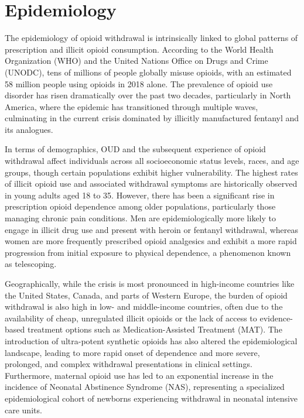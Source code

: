\section*{Epidemiology}
The epidemiology of opioid withdrawal is intrinsically linked to global patterns of prescription and illicit opioid consumption. According to the World Health Organization (WHO) and the United Nations Office on Drugs and Crime (UNODC), tens of millions of people globally misuse opioids, with an estimated 58 million people using opioids in 2018 alone. The prevalence of opioid use disorder has risen dramatically over the past two decades, particularly in North America, where the epidemic has transitioned through multiple waves, culminating in the current crisis dominated by illicitly manufactured fentanyl and its analogues.

In terms of demographics, OUD and the subsequent experience of opioid withdrawal affect individuals across all socioeconomic status levels, races, and age groups, though certain populations exhibit higher vulnerability. The highest rates of illicit opioid use and associated withdrawal symptoms are historically observed in young adults aged 18 to 35. However, there has been a significant rise in prescription opioid dependence among older populations, particularly those managing chronic pain conditions. Men are epidemiologically more likely to engage in illicit drug use and present with heroin or fentanyl withdrawal, whereas women are more frequently prescribed opioid analgesics and exhibit a more rapid progression from initial exposure to physical dependence, a phenomenon known as telescoping.

Geographically, while the crisis is most pronounced in high-income countries like the United States, Canada, and parts of Western Europe, the burden of opioid withdrawal is also high in low- and middle-income countries, often due to the availability of cheap, unregulated illicit opioids or the lack of access to evidence-based treatment options such as Medication-Assisted Treatment (MAT). The introduction of ultra-potent synthetic opioids has also altered the epidemiological landscape, leading to more rapid onset of dependence and more severe, prolonged, and complex withdrawal presentations in clinical settings. Furthermore, maternal opioid use has led to an exponential increase in the incidence of Neonatal Abstinence Syndrome (NAS), representing a specialized epidemiological cohort of newborns experiencing withdrawal in neonatal intensive care units.

